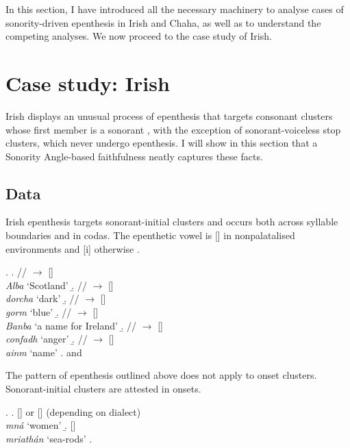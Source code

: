 \documentclass[12pt]{article}
\begin{document}
\bigskip

In this section, I have introduced all the necessary machinery to analyse cases of sonority-driven epenthesis in Irish and Chaha, as well as to understand the competing analyses. We now proceed to the case study of Irish.


\section{Case study: Irish} \label{irish}

Irish displays an unusual process of epenthesis that targets consonant clusters 
whose first member is a sonorant \citep{carnie.1994, ni.chiosain.1999}, with the 
exception of sonorant-voiceless stop clusters, which never undergo epenthesis. 
I will show in this section that a {\sc Sonority Angle}-based faithfulness
neatly captures these facts.

\subsection{Data}

Irish epenthesis targets sonorant-initial clusters and occurs both across syllable boundaries and in codas.  The epenthetic vowel is [] in nonpalatalised environments and [i] otherwise \citep{ni.chiosain.1999}.

\ex. \a. // $\rightarrow$ [] \\
         {\it Alba} `Scotland'
     \b. // $\rightarrow$ [] \\
         {\it dorcha} `dark'
     \b. //  $\rightarrow$  [] \\
         {\it gorm} `blue'
     \b. // $\rightarrow$ [] \\
         {\it Banba} `a name for Ireland'
     \b. // $\rightarrow$ [] \\
         {\it confadh} `anger'
     \b. // $\rightarrow$ [] \\
         {\it ainm} `name'
     \z.
     \citep[(37)]{carnie.1994} and \citep[(2)]{ni.chiosain.1999}

The pattern of epenthesis outlined above does not apply to onset clusters.  Sonorant-initial clusters
are attested in onsets.

\ex. \a. [] or [] (depending on dialect) \\
         {\it mn\'a} `women'
     \b. [] \\
         {\it mriath\'an} `sea-rods'
     \z.
     \citep[456]{swingle.1992}
\end{document}
